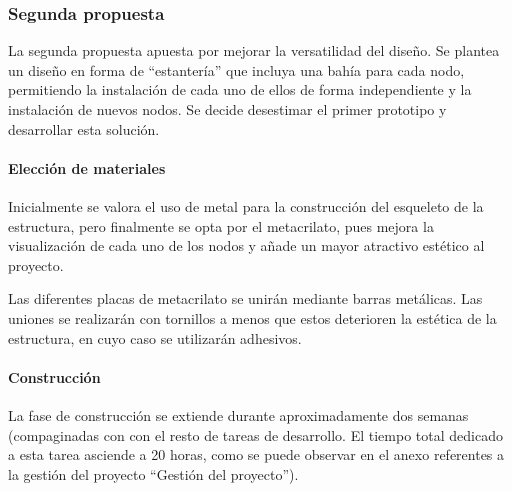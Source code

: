 \subsubsection{Segunda propuesta}

La segunda propuesta apuesta por mejorar la versatilidad del diseño. Se plantea un diseño en forma de ``estantería'' que incluya una bahía para cada nodo, permitiendo la instalación de cada uno de ellos de forma independiente y la instalación de nuevos nodos. Se decide desestimar el primer prototipo y desarrollar esta solución.

\paragraph{Elección de materiales\\}

Inicialmente se valora el uso de metal para la construcción del esqueleto de la estructura, pero finalmente se opta por el metacrilato, pues mejora la visualización de cada uno de los nodos y añade un mayor atractivo estético al proyecto.

Las diferentes placas de metacrilato se unirán mediante barras metálicas. Las uniones se realizarán con tornillos a menos que estos deterioren la estética de la estructura, en cuyo caso se utilizarán adhesivos.

\paragraph{Construcción\\}

La fase de construcción se extiende durante aproximadamente dos semanas (compaginadas con con el resto de tareas de desarrollo. El tiempo total dedicado a esta tarea asciende a 20 horas, como se puede observar en el anexo referentes a la gestión del proyecto ``Gestión del proyecto'').

